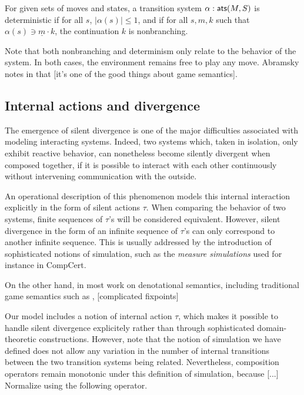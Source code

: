 {\begin{definition}
For given sets of moves and states,
a transition system $\alpha :  \mathsf{ats} (M, S)$
is deterministic if for all $s$, $|\alpha(s)| \le 1$,
and if for all $s, m, k$ such that $\alpha(s) \ni \underline{m} \cdot k$,
the continuation $k$ is nonbranching.
\end{definition}

Note that both nonbranching and determinism
only relate to the behavior of the system.
In both cases,
the environment remains free to play any move.
Abramsky notes in \cite{cspgs}
that [it's one of the good things about game semantics].

\subsection{Internal actions and divergence}

The emergence of silent divergence
is one of the major difficulties
associated with modeling interacting systems.
Indeed,
two systems which, taken in isolation,
only exhibit reactive behavior,
can nonetheless become silently divergent when composed together,
if it is possible to interact with each other continuously
without intervening communication with the outside.

An operational description of this phenomenon
models this internal interaction explicitly
in the form of silent actions $\tau$.
When comparing the behavior of two systems,
finite sequences of $\tau$'s will be considered equivalent.
However,
silent divergence in the form of an infinite sequence of $\tau$'s
can only correspond to another infinite sequence.
This is usually addressed by the introduction of
sophisticated notions of simulation,
such as the \emph{measure simulations} used for instance in CompCert.

On the other hand,
in most work on denotational semantics,
including traditional game semantics such as \cite{pcfgs},
[complicated fixpoints] 

Our model includes a notion of internal action $\tau$,
which makes it possible to handle silent divergence explicitely
rather than through sophisticated domain-theoretic constructions.
However,
note that the notion of simulation we have defined
does not allow any variation
in the number of internal transitions
between the two transition systems being related.
Nevertheless,
composition operators remain monotonic
under this definition of simulation,
because [...]
Normalize using the following operator.

}
